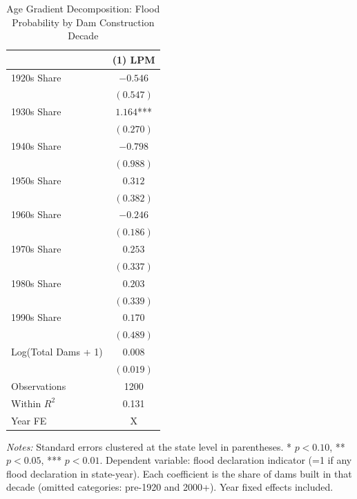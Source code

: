 \begin{table}[htbp]
\centering
\caption{Age Gradient Decomposition: Flood Probability by Dam Construction Decade}
\label{tab:gradient}
\begin{threeparttable}
\begin{tabular}{lc}
\toprule
 & (1) LPM \\
\midrule
1920s Share               & $-0.546$   \\
                          & $(0.547)$  \\[4pt]
1930s Share               & $1.164$*** \\
                          & $(0.270)$  \\[4pt]
1940s Share               & $-0.798$   \\
                          & $(0.988)$  \\[4pt]
1950s Share               & $0.312$    \\
                          & $(0.382)$  \\[4pt]
1960s Share               & $-0.246$   \\
                          & $(0.186)$  \\[4pt]
1970s Share               & $0.253$    \\
                          & $(0.337)$  \\[4pt]
1980s Share               & $0.203$    \\
                          & $(0.339)$  \\[4pt]
1990s Share               & $0.170$    \\
                          & $(0.489)$  \\[4pt]
Log(Total Dams + 1)       & $0.008$    \\
                          & $(0.019)$  \\
\midrule
Observations              & 1200       \\
Within $R^2$              & 0.131      \\
Year FE                   & X          \\
\bottomrule
\end{tabular}
\begin{tablenotes}[flushleft]
\small
\item \textit{Notes:} Standard errors clustered at the state level in parentheses. * $p<0.10$, ** $p<0.05$, *** $p<0.01$. Dependent variable: flood declaration indicator (=1 if any flood declaration in state-year). Each coefficient is the share of dams built in that decade (omitted categories: pre-1920 and 2000+). Year fixed effects included.
\end{tablenotes}
\end{threeparttable}
\end{table}
